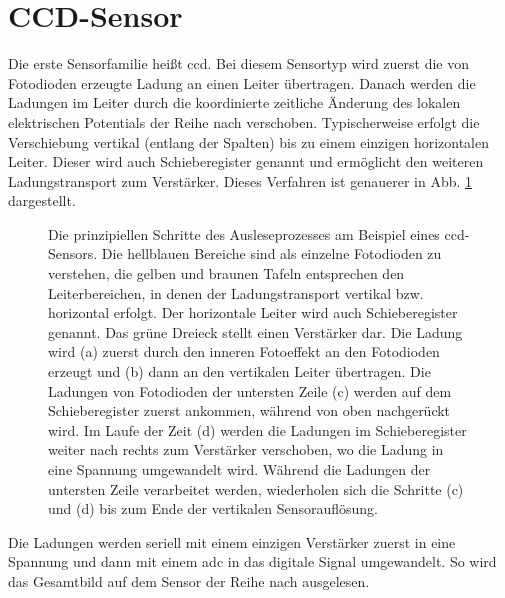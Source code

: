 \section{CCD-Sensor}
\label{text:ccd_theorie}
Die erste Sensorfamilie heißt \gls{ccd}. Bei diesem Sensortyp wird zuerst die von Fotodioden erzeugte Ladung an einen Leiter übertragen. Danach werden die Ladungen im Leiter durch die koordinierte zeitliche Änderung des lokalen elektrischen Potentials der Reihe nach verschoben. Typischerweise erfolgt die Verschiebung vertikal (entlang der Spalten) bis zu einem einzigen horizontalen Leiter. Dieser wird auch Schieberegister genannt und ermöglicht den weiteren Ladungstransport zum Verstärker. Dieses Verfahren ist genauerer in Abb. \ref{fig:ccd_scheme} dargestellt.
\begin{figure}[H]
    
    \caption{Die prinzipiellen Schritte des Ausleseprozesses am Beispiel eines  \gls{ccd}-Sensors. Die hellblauen Bereiche sind als einzelne Fotodioden zu verstehen, die gelben und braunen Tafeln entsprechen den Leiterbereichen, in denen der Ladungstransport vertikal bzw. horizontal erfolgt. Der horizontale Leiter wird auch Schieberegister genannt. Das grüne Dreieck stellt einen Verstärker dar. Die Ladung wird (a) zuerst durch den inneren Fotoeffekt an den Fotodioden erzeugt und (b) dann an den vertikalen Leiter übertragen. Die Ladungen von Fotodioden der untersten Zeile (c) werden auf dem Schieberegister zuerst ankommen, während von oben nachgerückt wird. Im Laufe der Zeit (d) werden die Ladungen im Schieberegister weiter nach rechts zum Verstärker verschoben, wo die Ladung in eine Spannung umgewandelt wird. Während die Ladungen der untersten Zeile verarbeitet werden, wiederholen sich die Schritte (c) und (d) bis zum Ende der vertikalen Sensorauflösung.}
    \label{fig:ccd_scheme}
\end{figure}
\noindent
Die Ladungen werden seriell mit einem einzigen Verstärker zuerst in eine Spannung und dann mit einem \gls{adc} in das digitale Signal umgewandelt. So wird das Gesamtbild auf dem Sensor der Reihe nach ausgelesen.

